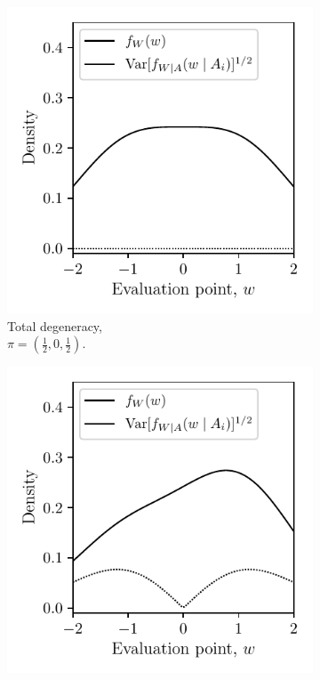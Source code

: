 \begin{figure}[t]
  \centering
  \begin{subfigure}{0.32\textwidth}
    \centering
    \includegraphics[scale=0.64]{graphics/distribution_plot_total.pdf}
    \caption{Total degeneracy, \\
    $\pi = \left( \frac{1}{2}, 0, \frac{1}{2} \right)$.}
  \end{subfigure}
  \begin{subfigure}{0.32\textwidth}
    \centering
    \includegraphics[scale=0.64]{graphics/distribution_plot_partial.pdf}

\end{subfigure}
\end{figure}
